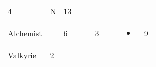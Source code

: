\documentclass[12pt]{article}
\newcommand{\indexClass}[1]{\index{#1}}
\newcommand{\class}[1]{#1\indexClass{#1}}
\begin{document}
\begin{longtable}[]{@{}llllllllll@{}}
\begin{minipage}[t]{0.06\columnwidth}
4
\strut\end{minipage} &
\begin{minipage}[t]{0.07\columnwidth}\raggedright\strut
N
\strut\end{minipage} &
\begin{minipage}[t]{0.08\columnwidth}\raggedright\strut
13
\strut\end{minipage}\tabularnewline
\begin{minipage}[t]{0.13\columnwidth}\raggedright\strut
\class{Alchemist}
\strut\end{minipage} &
\begin{minipage}[t]{0.06\columnwidth}\raggedright\strut
\strut\end{minipage} &
\begin{minipage}[t]{0.06\columnwidth}\raggedright\strut
6
\strut\end{minipage} &
\begin{minipage}[t]{0.06\columnwidth}\raggedright\strut
\strut\end{minipage} &
\begin{minipage}[t]{0.06\columnwidth}\raggedright\strut
\strut\end{minipage} &
\begin{minipage}[t]{0.06\columnwidth}\raggedright\strut
3
\strut\end{minipage} &
\begin{minipage}[t]{0.06\columnwidth}\raggedright\strut
\strut\end{minipage} &
\begin{minipage}[t]{0.06\columnwidth}\raggedright\strut
\strut\end{minipage} &
\begin{minipage}[t]{0.07\columnwidth}\raggedright\strut
\begin{itemize}
\item
\end{itemize}
\strut\end{minipage} &
\begin{minipage}[t]{0.08\columnwidth}\raggedright\strut
9
\strut\end{minipage}\tabularnewline
\begin{minipage}[t]{0.13\columnwidth}\raggedright\strut
\class{Valkyrie}
\strut\end{minipage} &
\begin{minipage}[t]{0.06\columnwidth}\raggedright\strut
2
\strut\end{minipage} &
\begin{minipage}[t]{0.06\columnwidth}\raggedright\strut

\end{minipage}
\end{longtable}
\end{document}
